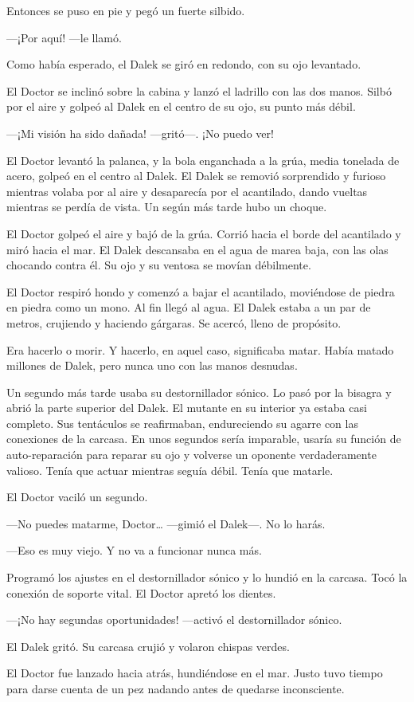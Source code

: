 Entonces se puso en pie y pegó un fuerte silbido.

---¡Por aquí! ---le llamó.

Como había esperado, el Dalek se giró en redondo, con su ojo levantado.

El Doctor se inclinó sobre la cabina y lanzó el ladrillo con las dos
manos. Silbó por el aire y golpeó al Dalek en el centro de su ojo, su
punto más débil.

---¡Mi visión ha sido dañada! ---gritó---. ¡No puedo ver!

El Doctor levantó la palanca, y la bola enganchada a la grúa, media
tonelada de acero, golpeó en el centro al Dalek. El Dalek se removió
sorprendido y furioso mientras volaba por al aire y desaparecía por el
acantilado, dando vueltas mientras se perdía de vista. Un según más
tarde hubo un choque.

El Doctor golpeó el aire y bajó de la grúa. Corrió hacia el borde del
acantilado y miró hacia el mar. El Dalek descansaba en el agua de marea
baja, con las olas chocando contra él. Su ojo y su ventosa se movían
débilmente.

El Doctor respiró hondo y comenzó a bajar el acantilado, moviéndose de
piedra en piedra como un mono. Al fin llegó al agua. El Dalek estaba a
un par de metros, crujiendo y haciendo gárgaras. Se acercó, lleno de
propósito.

Era hacerlo o morir. Y hacerlo, en aquel caso, significaba matar. Había
matado millones de Dalek, pero nunca uno con las manos desnudas.

Un segundo más tarde usaba su destornillador sónico. Lo pasó por la
bisagra y abrió la parte superior del Dalek. El mutante en su interior
ya estaba casi completo. Sus tentáculos se reafirmaban, endureciendo su
agarre con las conexiones de la carcasa. En unos segundos sería
imparable, usaría su función de auto-reparación para reparar su ojo y
volverse un oponente verdaderamente valioso. Tenía que actuar mientras
seguía débil. Tenía que matarle.

El Doctor vaciló un segundo.

---No puedes matarme, Doctor\ldots{} ---gimió el Dalek---. No lo harás.

---Eso es muy viejo. Y no va a funcionar nunca más.

Programó los ajustes en el destornillador sónico y lo hundió en la
carcasa. Tocó la conexión de soporte vital. El Doctor apretó los
dientes.

---¡No hay segundas oportunidades! ---activó el destornillador sónico.

El Dalek gritó. Su carcasa crujió y volaron chispas verdes.

El Doctor fue lanzado hacia atrás, hundiéndose en el mar. Justo tuvo
tiempo para darse cuenta de un pez nadando antes de quedarse
inconsciente.